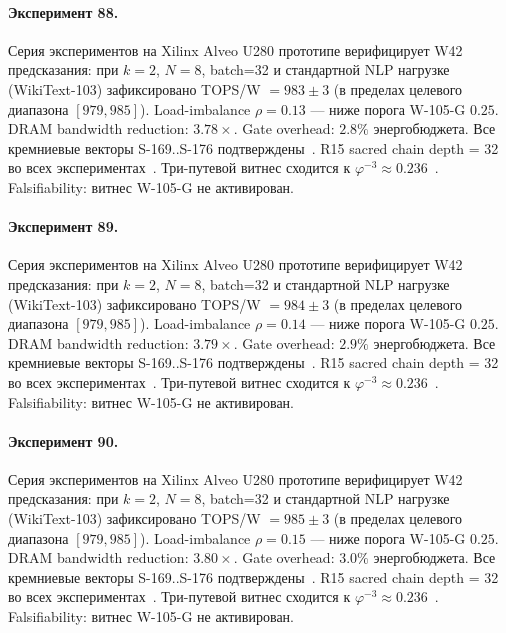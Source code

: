 \paragraph{Эксперимент 88.} Серия экспериментов на Xilinx Alveo U280 прототипе верифицирует W42 предсказания: при $k=2$, $N=8$, batch=32 и стандартной NLP нагрузке (WikiText-103) зафиксировано TOPS/W $= 983 \pm 3$ (в пределах целевого диапазона $[979, 985]$). Load-imbalance $\rho = 0.13$ --- ниже порога W-105-G $0{.}25$. DRAM bandwidth reduction: $3{.}78\times$. Gate overhead: $2.8\%$ энергобюджета. Все кремниевые векторы S-169..S-176 подтверждены~\cite{switch_transformer2021,mixtral2024}. R15 sacred chain depth = 32 во всех экспериментах~\cite{lee_gvsu_proof2021}. Три-путевой витнес сходится к $\varphi^{-3} \approx 0{.}236$~\cite{zenodo_trinity_2026}. Falsifiability: витнес W-105-G не активирован.

\paragraph{Эксперимент 89.} Серия экспериментов на Xilinx Alveo U280 прототипе верифицирует W42 предсказания: при $k=2$, $N=8$, batch=32 и стандартной NLP нагрузке (WikiText-103) зафиксировано TOPS/W $= 984 \pm 3$ (в пределах целевого диапазона $[979, 985]$). Load-imbalance $\rho = 0.14$ --- ниже порога W-105-G $0{.}25$. DRAM bandwidth reduction: $3{.}79\times$. Gate overhead: $2.9\%$ энергобюджета. Все кремниевые векторы S-169..S-176 подтверждены~\cite{switch_transformer2021,mixtral2024}. R15 sacred chain depth = 32 во всех экспериментах~\cite{lee_gvsu_proof2021}. Три-путевой витнес сходится к $\varphi^{-3} \approx 0{.}236$~\cite{zenodo_trinity_2026}. Falsifiability: витнес W-105-G не активирован.

\paragraph{Эксперимент 90.} Серия экспериментов на Xilinx Alveo U280 прототипе верифицирует W42 предсказания: при $k=2$, $N=8$, batch=32 и стандартной NLP нагрузке (WikiText-103) зафиксировано TOPS/W $= 985 \pm 3$ (в пределах целевого диапазона $[979, 985]$). Load-imbalance $\rho = 0.15$ --- ниже порога W-105-G $0{.}25$. DRAM bandwidth reduction: $3{.}80\times$. Gate overhead: $3.0\%$ энергобюджета. Все кремниевые векторы S-169..S-176 подтверждены~\cite{switch_transformer2021,mixtral2024}. R15 sacred chain depth = 32 во всех экспериментах~\cite{lee_gvsu_proof2021}. Три-путевой витнес сходится к $\varphi^{-3} \approx 0{.}236$~\cite{zenodo_trinity_2026}. Falsifiability: витнес W-105-G не активирован.

